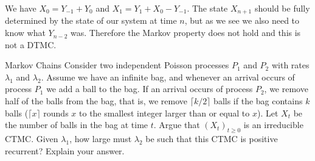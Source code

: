 \begin{solution}

  We have $X_0=Y_{-1}+Y_{0}$ and $X_1=Y_1+X_0-Y_{-1}$. The state $X_{n+1}$ should be fully determined by the state of our system at time $n$, but as we see we also need to know what $Y_{n-2}$ was. Therefore the Markov property does not hold and this is not a DTMC.
\end{solution}

\begin{problem}{Markov Chains}
Consider two independent Poisson processes \( P_1 \) and \( P_2 \) with rates \( \lambda_1 \) and \( \lambda_2 \). Assume we have an infinite bag, and whenever an arrival occurs of process \( P_1 \) we add a ball to the bag. If an arrival occurs of process \( P_2 \), we remove half of the balls from the bag, that is, we remove \( \lceil k/2 \rceil \) balls if the bag contains \( k \) balls (\( \lceil x \rceil \) rounds \( x \) to the smallest integer larger than or equal to \( x \)). Let \( X_t \) be the number of balls in the bag at time \( t \). Argue that \( (X_t)_{t \geq 0} \) is an irreducible CTMC. Given \( \lambda_1 \), how large must \( \lambda_2 \) be such that this CTMC is positive recurrent? Explain your answer.
\end{problem}
